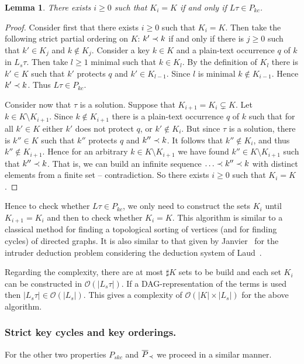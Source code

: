 \documentclass[acmtocl,acmnow]{acmtrans2m}
\newtheorem{lemma}[theorem]{Lemma}
\newcommand{\card}[1]{\sharp{#1}}
\newcommand{\lset}[1]{#1_s}
\begin{document}
\begin{lemma}
There exists $i\ge 0$ such that $K_i=K$ if and only if $L\tau\in P_{kc}$.
\end{lemma}
\begin{proof}
Consider first that there exists $i\ge 0$ such that $K_i=K$. Then take the following strict partial ordering on
$K$: $k'\prec k$ if and only if there is $j\ge 0$ such that $k'\in K_j$ and $k\notin K_j$. Consider a key
$k\in K$ and a plain-text occurrence $q$ of $k$ in $\lset{L}\tau$. Then take $l\ge 1$ minimal such that
$k\in K_l$. By the definition of $K_l$ there is $k'\in K$ such that $k'$ protects $q$ and $k'\in K_{l-1}$.
Since $l$ is minimal $k\notin K_{i-1}$. Hence $k'\prec k$. Thus $L\tau\in P_{kc}$. 

Consider now that $\tau$ is a solution. Suppose that $K_{i+1}=K_i\subsetneq K$. Let $k\in K\setminus K_{i+1}$. Since $k\not\in K_{i+1}$ there is a plain-text occurrence $q$
of $k$ such that for all $k'\in K$ either $k'$ does not protect $q$, or $k'\notin K_{i}$. But
since $\tau$ is a solution, there is $k''\in K$ such that $k''$ protects $q$ and $k''\prec k$. It follows that
$k''\notin K_{i}$, and thus $k''\notin K_{i+1}$. Hence for an arbitrary $k\in K\setminus K_{i+1}$ we have
found $k''\in K\setminus K_{i+1}$ such that $k''\prec k$. That is, we can build an infinite sequence
$\dots \sko k'' \sko k$ with distinct elements from a finite set -- contradiction. So there exists $i\ge 0$
such that $K_i=K$.
\end{proof}

Hence to check whether $L\tau\in P_{kc}$, we only need to construct the sets $K_i$ until
$K_{i+1}=K_{i}$ and then to check whether $K_i=K$. This algorithm is similar to a classical method for
finding a topological sorting of vertices (and for finding cycles) of directed graphs. 
It is also similar to
that given by Janvier~\cite{Janvier-these} for the intruder deduction problem considering the deduction
system of Laud~\cite{Laud-NORDSEC02}.

Regarding the complexity, there are at most $\card{K}$ sets to be build and each set $K_i$ can be constructed in
$\mathcal{O}(|\lset{L}\tau|)$. If a DAG-representation of the terms is used then
$|\lset{L}\tau|\in\mathcal{O}(|\lset{L}|)$. This gives a complexity of $\mathcal{O}(|K|\times |\lset{L}|)$
for the above algorithm.

\medskip

\subsubsection{Strict key cycles and key orderings.}
For the other two properties $P_{skc}$ and $\overline{P}_{\prec}$ we proceed in a similar manner. 
\end{document}
